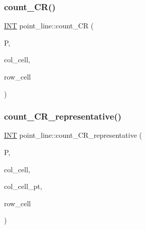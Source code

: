 \mbox{\label{classpoint__line_a8f0244123fc08497e33a58c8e78bec6a}} 
\subsubsection{\texorpdfstring{count\+\_\+\+C\+R()}{count\_CR()}}
{\footnotesize\ttfamily \mbox{\hyperlink{galois_8h_a09fddde158a3a20bd2dcadb609de11dc}{I\+NT}} point\+\_\+line\+::count\+\_\+\+CR (\begin{DoxyParamCaption}\item[{\mbox{\hyperlink{classpartitionstack}{partitionstack}} \&}]{P,  }\item[{\mbox{\hyperlink{galois_8h_a09fddde158a3a20bd2dcadb609de11dc}{I\+NT}}}]{col\+\_\+cell,  }\item[{\mbox{\hyperlink{galois_8h_a09fddde158a3a20bd2dcadb609de11dc}{I\+NT}}}]{row\+\_\+cell }\end{DoxyParamCaption})}

\mbox{\label{classpoint__line_a96c2f5347f6454d721114f4c118fa900}} 
\subsubsection{\texorpdfstring{count\+\_\+\+C\+R\+\_\+representative()}{count\_CR\_representative()}}
{\footnotesize\ttfamily \mbox{\hyperlink{galois_8h_a09fddde158a3a20bd2dcadb609de11dc}{I\+NT}} point\+\_\+line\+::count\+\_\+\+C\+R\+\_\+representative (\begin{DoxyParamCaption}\item[{\mbox{\hyperlink{classpartitionstack}{partitionstack}} \&}]{P,  }\item[{\mbox{\hyperlink{galois_8h_a09fddde158a3a20bd2dcadb609de11dc}{I\+NT}}}]{col\+\_\+cell,  }\item[{\mbox{\hyperlink{galois_8h_a09fddde158a3a20bd2dcadb609de11dc}{I\+NT}}}]{col\+\_\+cell\+\_\+pt,  }\item[{\mbox{\hyperlink{galois_8h_a09fddde158a3a20bd2dcadb609de11dc}{I\+NT}}}]{row\+\_\+cell }\end{DoxyParamCaption})}

